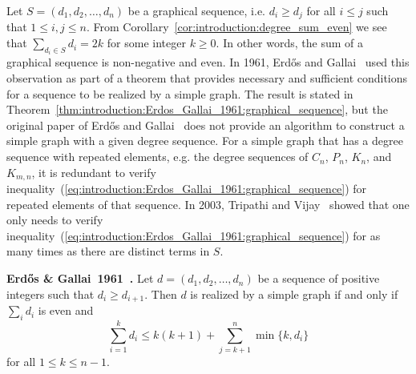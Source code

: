 
Let $S = (d_1, d_2, \dots, d_n)$ be a graphical sequence, i.e.
$d_i \geq d_j$ for all $i \leq j$ such that $1 \leq i, j \leq n$. From
Corollary~\ref{cor:introduction:degree_sum_even} we see that
$\sum_{d_i \in S} d_i = 2k$ for some integer $k \geq 0$. In other
words, the sum of a graphical sequence is non-negative and
even. In 1961, Erd\H{o}s and Gallai~\cite{ErdosGallai1961} used this
observation as part of a theorem that provides necessary and
sufficient conditions for a sequence to be realized by a simple
graph. The result is stated in
Theorem~\ref{thm:introduction:Erdos_Gallai_1961:graphical_sequence},
but the original paper of Erd\H{o}s and Gallai~\cite{ErdosGallai1961}
does not provide an algorithm to construct a simple graph with a given
degree sequence. For a simple graph that has a degree sequence with
repeated elements, e.g. the degree sequences of $C_n$, $P_n$, $K_n$,
and $K_{m,n}$, it is redundant to verify
inequality~(\ref{eq:introduction:Erdos_Gallai_1961:graphical_sequence})
for repeated elements of that sequence. In 2003, Tripathi and
Vijay~\cite{TripathiVijay2003} showed that one only needs to verify
inequality~(\ref{eq:introduction:Erdos_Gallai_1961:graphical_sequence})
for as many times as there are distinct terms in $S$.

\begin{theorem}
\label{thm:introduction:Erdos_Gallai_1961:graphical_sequence}
\textbf{Erd\H{o}s \& Gallai~1961~\cite{ErdosGallai1961}.}
Let $d = (d_1, d_2, \dots, d_n)$ be a sequence of positive integers
such that $d_i \geq d_{i+1}$. Then $d$ is realized by a simple graph
if and only if $\sum_i d_i$ is even and
%
\begin{equation}
\label{eq:introduction:Erdos_Gallai_1961:graphical_sequence}
\sum_{i=1}^k d_i
\leq
k(k + 1) + \sum_{j=k+1}^n \min\{k, d_i\}
\end{equation}
%
for all $1 \leq k \leq n - 1$.
\end{theorem}

